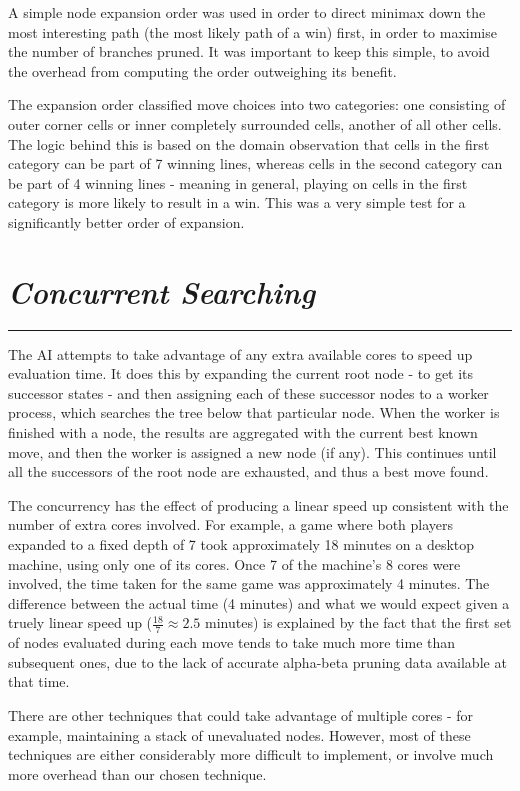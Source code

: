 \documentclass[10pt]{report}
\begin{document}
\begin{multicols}{2}
A simple node expansion order was used in order to direct minimax down the most interesting path (the most likely path of a win) first, in order to maximise the number of branches pruned. It was important to keep this simple, to avoid the overhead from computing the order outweighing its benefit.

The expansion order classified move choices into two categories: one consisting of outer corner cells or inner completely surrounded cells, another of all other cells. The logic behind this is based on the domain observation that cells in the first category can be part of 7 winning lines, whereas cells in the second category can be part of 4 winning lines - meaning in general, playing on cells in the first category is more likely to result in a win. This was a very simple test for a significantly better order of expansion.

\section*{\emph{\textmd{Concurrent Searching}}}
\hrule
\vspace{0.4cm}

The AI attempts to take advantage of any extra available cores to speed up evaluation time. It does this by expanding the current root node - to get its successor states - and then assigning each of these successor nodes to a worker process, which searches the tree below that particular node. When the worker is finished with a node, the results are aggregated with the current best known move, and then the worker is assigned a new node (if any). This continues until all the successors of the root node are exhausted, and thus a best move found.

The concurrency has the effect of producing a linear speed up consistent with the number of extra cores involved. For example, a game where both players expanded to a fixed depth of 7 took approximately 18 minutes on a desktop machine, using only one of its cores. Once 7 of the machine's 8 cores were involved, the time taken for the same game was approximately 4 minutes. The difference between the actual time (4 minutes) and what we would expect given a truely linear speed up ($\frac{18}{7} \approx 2.5$ minutes) is explained by the fact that the first set of nodes evaluated during each move tends to take much more time than subsequent ones, due to the lack of accurate alpha-beta pruning data available at that time.

There are other techniques that could take advantage of multiple cores - for example, maintaining a stack of unevaluated nodes. However, most of these techniques are either considerably more difficult to implement, or involve much more overhead than our chosen technique.


\end{multicols}
\end{document}
